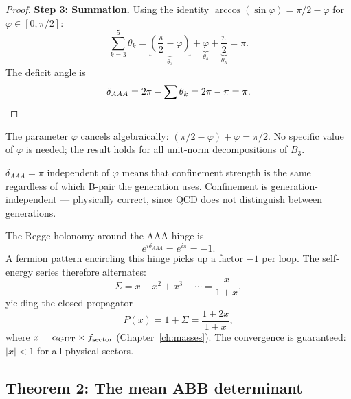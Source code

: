 \begin{proof}
\medskip\noindent\textbf{Step 3: Summation.}
Using the identity $\arccos(\sin\varphi) = \pi/2 - \varphi$ for
$\varphi \in [0, \pi/2]$:
\begin{equation}
\sum_{k=3}^{5} \theta_k
= \underbrace{\left(\frac{\pi}{2} - \varphi\right)}_{\theta_3}
+ \underbrace{\varphi}_{\theta_4}
+ \underbrace{\frac{\pi}{2}}_{\theta_5}
= \pi.
\end{equation}
The deficit angle is
\begin{equation}
\delta_{AAA} = 2\pi - \sum\theta_k = 2\pi - \pi = \pi. \qedhere
\end{equation}
\end{proof}

\begin{remark}[Universality]
The parameter $\varphi$ cancels algebraically: $(\pi/2 - \varphi) + \varphi = \pi/2$.  No specific value of $\varphi$ is needed; the result holds for all unit-norm decompositions of $B_3$.
\end{remark}

\begin{remark}
$\delta_{AAA} = \pi$ independent of $\varphi$ means that confinement strength is the same regardless of which B-pair the generation uses.  Confinement is generation-independent --- physically correct, since QCD does not distinguish between generations.
\end{remark}

\begin{corollary}
\label{cor:alternating}
The Regge holonomy around the AAA hinge is
\begin{equation}
e^{i\delta_{AAA}} = e^{i\pi} = -1.
\end{equation}
A fermion pattern encircling this hinge picks up a factor $-1$ per
loop.  The self-energy series therefore alternates:
\begin{equation}
\Sigma = x - x^2 + x^3 - \cdots = \frac{x}{1+x},
\end{equation}
yielding the closed propagator
\begin{equation}
P(x) = 1 + \Sigma = \frac{1 + 2x}{1 + x},
\end{equation}
where $x = \alpha_{\mathrm{GUT}} \times f_{\text{sector}}$ (Chapter~\ref{ch:masses}).
The convergence is guaranteed: $|x| < 1$ for all physical sectors.
\end{corollary}

\subsection{Theorem 2: The mean ABB determinant}
\label{sec:thm_ABB}

